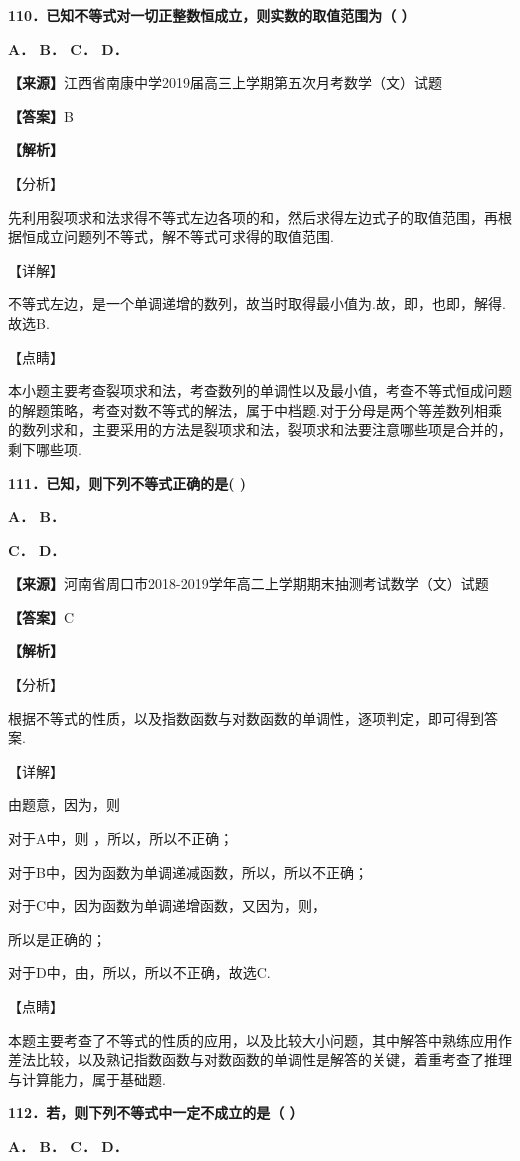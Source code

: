 \textbf{110．已知不等式对一切正整数恒成立，则实数的取值范围为（ ）}

\textbf{A． B． C． D．}

\textbf{【来源】}江西省南康中学2019届高三上学期第五次月考数学（文）试题

\textbf{【答案】}B

\textbf{【解析】}

【分析】

先利用裂项求和法求得不等式左边各项的和，然后求得左边式子的取值范围，再根据恒成立问题列不等式，解不等式可求得的取值范围.

【详解】

不等式左边，是一个单调递增的数列，故当时取得最小值为.故，即，也即，解得.故选B.

【点睛】

本小题主要考查裂项求和法，考查数列的单调性以及最小值，考查不等式恒成问题的解题策略，考查对数不等式的解法，属于中档题.对于分母是两个等差数列相乘的数列求和，主要采用的方法是裂项求和法，裂项求和法要注意哪些项是合并的，剩下哪些项.

\textbf{111．已知，则下列不等式正确的是( )}

\textbf{A． B．}

\textbf{C． D．}

\textbf{【来源】}河南省周口市2018-2019学年高二上学期期末抽测考试数学（文）试题

\textbf{【答案】}C

\textbf{【解析】}

【分析】

根据不等式的性质，以及指数函数与对数函数的单调性，逐项判定，即可得到答案.

【详解】

由题意，因为，则

对于A中，则 ，所以，所以不正确；

对于B中，因为函数为单调递减函数，所以，所以不正确；

对于C中，因为函数为单调递增函数，又因为，则，

所以是正确的；

对于D中，由，所以，所以不正确，故选C.

【点睛】

本题主要考查了不等式的性质的应用，以及比较大小问题，其中解答中熟练应用作差法比较，以及熟记指数函数与对数函数的单调性是解答的关键，着重考查了推理与计算能力，属于基础题.

\textbf{112．若，则下列不等式中一定不成立的是（ ）}

\textbf{A． B． C． D．}

